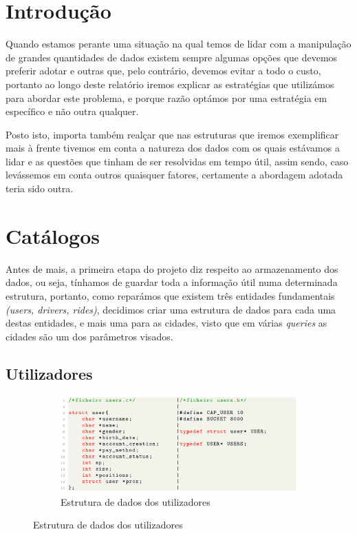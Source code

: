 \documentclass[12pt,a4paper]{report}
\begin{document}
\chapter{Introdução}

Quando estamos perante uma situação na qual temos de lidar com a manipulação de grandes quantidades de dados existem sempre algumas opções que devemos preferir adotar e outras que, pelo contrário, devemos evitar a todo o custo, portanto ao longo deste relatório iremos explicar as estratégias que utilizámos para abordar este problema, e porque razão optámos por uma estratégia em específico e não outra qualquer.

Posto isto, importa também realçar que nas estruturas que iremos exemplificar mais à frente tivemos em conta a natureza dos dados com os quais estávamos a lidar e as questões que tinham de ser resolvidas em tempo útil, assim sendo, caso levássemos em conta outros quaisquer fatores, certamente a abordagem adotada teria sido outra.

\chapter{Catálogos}

Antes de mais, a primeira etapa do projeto diz respeito ao armazenamento dos dados, ou seja, tínhamos de guardar toda a informação útil numa determinada estrutura, portanto, como reparámos que existem três entidades fundamentais \textit{(users, drivers, rides)}, decidimos criar uma estrutura de dados para cada uma destas entidades, e mais uma para as cidades, visto que em várias \textit{queries} as cidades são um dos parâmetros visados.

\section{Utilizadores}

\begin{figure}[h]
    \centering
    \begin{subfigure}{\textwidth}
        \centering
        \includegraphics[width=1\linewidth]{images/users.png}
        \caption*{Estrutura de dados dos utilizadores}
        \label{fig:users}
    \end{subfigure}
\end{figure}
\end{document}
